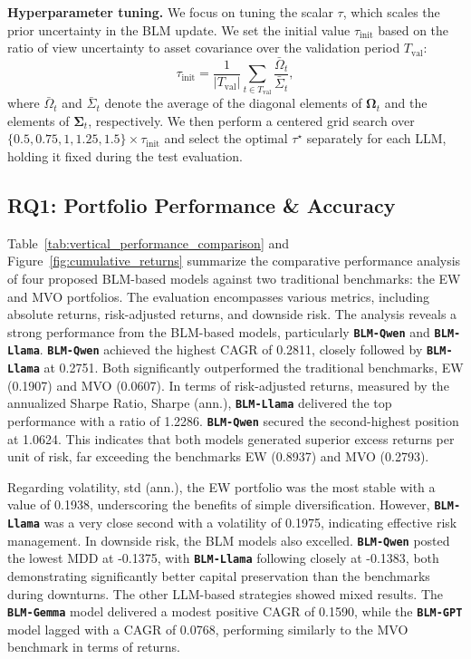 \textbf{Hyperparameter tuning.} We focus on tuning the scalar $\tau$, which scales the prior uncertainty in the BLM update. We set the initial value $\tau_{\text{init}}$ based on the ratio of view uncertainty to asset covariance over the validation period $T_{\text{val}}$:
\begin{equation}
\tau_{\text{init}}=\frac{1}{|T_{\text{val}}|}\sum_{t\in T_{\text{val}}}\frac{\bar{\Omega}_t}{\bar{\Sigma}_t},    
\end{equation}
where $\bar{\Omega}_t$ and $\bar{\Sigma}_t$ denote the average of the diagonal elements of $\mathbf{\Omega}_t$ and the elements of $\boldsymbol{\Sigma}_t$, respectively. We then perform a centered grid search over $\{0.5,0.75,1,1.25,1.5\}\times\tau_{\text{init}}$ and select the optimal $\tau^\star$ separately for each LLM, holding it fixed during the test evaluation.

\subsection{RQ1: Portfolio Performance \& Accuracy}
Table~\ref{tab:vertical_performance_comparison} and Figure~\ref{fig:cumulative_returns} summarize the comparative performance analysis of four proposed BLM-based models against two traditional benchmarks: the EW and MVO portfolios. The evaluation encompasses various metrics, including absolute returns, risk-adjusted returns, and downside risk.
The analysis reveals a strong performance from the BLM-based models, particularly \textbf{\texttt{BLM-Qwen}} and \textbf{\texttt{BLM-Llama}}. \textbf{\texttt{BLM-Qwen}} achieved the highest CAGR of 0.2811, closely followed by \textbf{\texttt{BLM-Llama}} at 0.2751. Both significantly outperformed the traditional benchmarks, EW (0.1907) and MVO (0.0607). In terms of risk-adjusted returns, measured by the annualized Sharpe Ratio, Sharpe (ann.), \textbf{\texttt{BLM-Llama}} delivered the top performance with a ratio of 1.2286. \textbf{\texttt{BLM-Qwen}} secured the second-highest position at 1.0624. This indicates that both models generated superior excess returns per unit of risk, far exceeding the benchmarks EW (0.8937) and MVO (0.2793).

\begin{table}[H]
\end{table}
Regarding volatility, std (ann.), the EW portfolio was the most stable with a value of 0.1938, underscoring the benefits of simple diversification. However, \textbf{\texttt{BLM-Llama}} was a very close second with a volatility of 0.1975, indicating effective risk management. In downside risk, the BLM models also excelled. \textbf{\texttt{BLM-Qwen}} posted the lowest MDD at -0.1375, with \textbf{\texttt{BLM-Llama}} following closely at -0.1383, both demonstrating significantly better capital preservation than the benchmarks during downturns.
The other LLM-based strategies showed mixed results. The \textbf{\texttt{BLM-Gemma}} model delivered a modest positive CAGR of 0.1590, while the \textbf{\texttt{BLM-GPT}} model lagged with a CAGR of 0.0768, performing similarly to the MVO benchmark in terms of returns.

